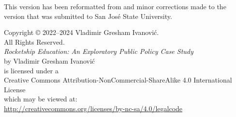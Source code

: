 
\thispagestyle{empty}
\begin{vplace}[1]
\footnotesize
\noindent{}This version has been reformatted from and minor corrections made to the version that was submitted to San José State University. 

\vspace{1in}
\begin{center}
  Copyright © 2022–2024 Vladimir Gresham Ivanović.\\
  All Rights Reserved.\\\bigskip\bigskip
  \textit{Rocketship Education: An Exploratory Public Policy Case Study}\\
  by Vladimir Gresham Ivanović\\
  is licensed under a \\
  Creative Commons Attribution-NonCommercial-ShareAlike 4.0 International License\\
  which may be viewed at:\\
  \url{http://creativecommons.org/licenses/by-nc-sa/4.0/legalcode}
\end{center}
\end{vplace}
  
